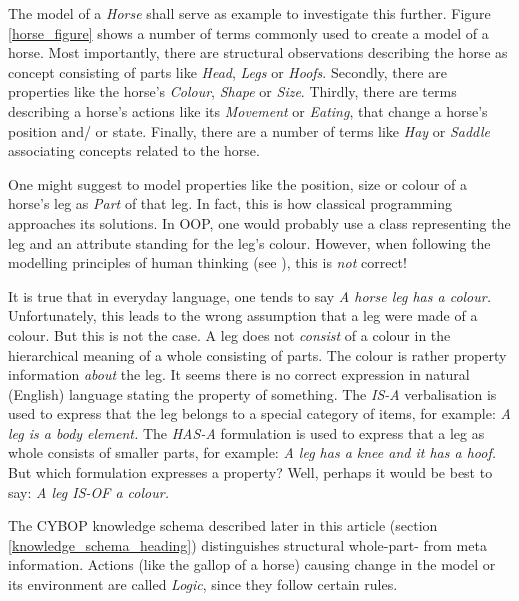 The model of a \emph{Horse} shall serve as example to investigate this further.
Figure \ref{horse_figure} shows a number of terms commonly used to create a
model of a horse. Most importantly, there are structural observations
describing the horse as concept consisting of parts like \emph{Head},
\emph{Legs} or \emph{Hoofs}. Secondly, there are properties like the horse's
\emph{Colour}, \emph{Shape} or \emph{Size}. Thirdly, there are terms describing
a horse's actions like its \emph{Movement} or \emph{Eating}, that change a
horse's position and/ or state. Finally, there are a number of terms like
\emph{Hay} or \emph{Saddle} associating concepts related to the horse.

One might suggest to model properties like the position, size or colour of a
horse's leg as \emph{Part} of that leg. In fact, this is how classical
programming approaches its solutions. In OOP, one would probably use a class
representing the leg and an attribute standing for the leg's colour. However,
when following the modelling principles of human thinking (see
\cite{heller2004}), this is \emph{not} correct!

It is true that in everyday language, one tends to say \textit{A horse leg
\emph{has a} colour.} Unfortunately, this leads to the wrong assumption that a
leg were made of a colour. But this is not the case. A leg does not
\emph{consist} of a colour in the hierarchical meaning of a whole consisting of
parts. The colour is rather property information \emph{about} the leg. It seems
there is no correct expression in natural (English) language stating the
property of something. The \emph{IS-A} verbalisation is used to express that
the leg belongs to a special category of items, for example: \textit{A leg is a
body element.} The \emph{HAS-A} formulation is used to express that a leg as
whole consists of smaller parts, for example: \textit{A leg has a knee and it
has a hoof.} But which formulation expresses a property? Well, perhaps it would
be best to say: \textit{A leg IS-OF a colour.}

The CYBOP knowledge schema described later in this article (section
\ref{knowledge_schema_heading}) distinguishes structural whole-part- from meta
information. Actions (like the gallop of a horse) causing change in the model
or its environment are called \emph{Logic}, since they follow certain rules.
